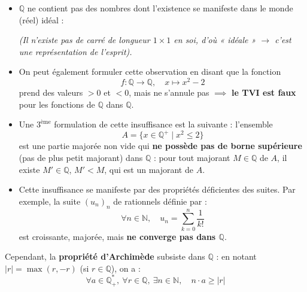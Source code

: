 \documentclass[a4paper,11pt]{article}
\newcommand{\N}{\mathbb{N}}
\newcommand{\Q}{\mathbb{Q}}
\newcommand{\mot}[1]{\textcolor{bordeaux}{\textbf{#1}}}
\begin{document}
\begin{itemize}
    \item $\Q$ ne contient pas des nombres dont l'existence se manifeste dans le monde (réel) idéal :
    
    \begin{center}
    \end{center}
    \textit{(Il n'existe pas de carré de longueur $1 \times 1$ en soi, d'où « idéale » $\to$ c'est une représentation de l'esprit).}

    \item On peut également formuler cette observation en disant que la fonction
    \[
    f : \Q \longrightarrow \Q, \quad x \longmapsto x^2 - 2
    \]
    prend des valeurs $> 0$ et $< 0$, mais ne s'annule pas $\implies$ \mot{le TVI est faux} pour les fonctions de $\Q$ dans $\Q$.

    \item Une $3^{\text{ème}}$ formulation de cette insuffisance est la suivante : l'ensemble
    \[
    A = \{ x \in \Q^+ \mid x^2 \le 2 \}
    \]
    est une partie majorée non vide qui \mot{ne possède pas de borne supérieure} (pas de plus petit majorant) dans $\Q$ : pour tout majorant $M \in \Q$ de $A$, il existe $M' \in \Q$, $M' < M$, qui est un majorant de $A$.

    \item Cette insuffisance se manifeste par des propriétés déficientes des suites. Par exemple, la suite $(u_n)_n$ de rationnels définie par :
    \[
    \forall n \in \N, \quad u_n = \sum_{k=0}^n \frac{1}{k!}
    \]
    est croissante, majorée, mais \mot{ne converge pas dans $\Q$}.
\end{itemize}

\begin{remarque}
Cependant, la \mot{propriété d'Archimède} subsiste dans $\Q$ : en notant $|r| = \max(r, -r)$ (si $r \in \Q$), on a :
\[
\forall a \in \Q_+^*, \ \forall r \in \Q, \ \exists n \in \N, \quad n \cdot a \ge |r|
\]
\end{remarque}
\end{document}
